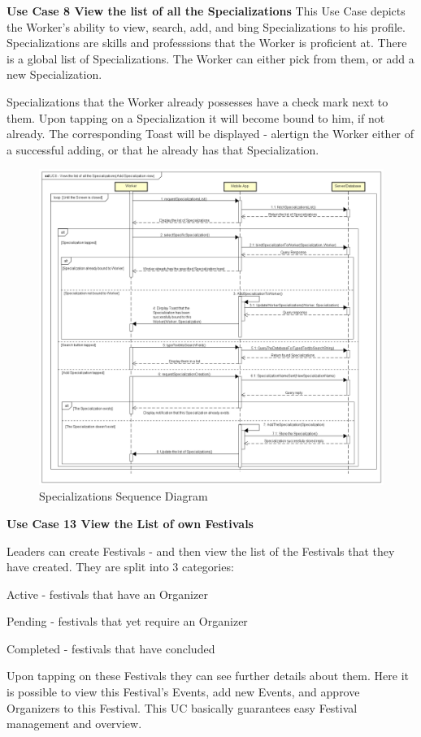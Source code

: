 				\textbf{Use Case 8 View the list of all the Specializations}
				This Use Case depicts the Worker's ability to view, search, add, and bing Specializations to his profile. Specializations are skills and professsions that the Worker is proficient at. There is a global list of Specializations. The Worker can either pick from them, or add a new Specialization.
				
				Specializations that the Worker already possesses have a check mark next to them. Upon tapping on a Specialization it will become bound to him, if not already. The corresponding Toast will be displayed - alertign the Worker either of a successful adding, or that he already has that Specialization. 
				\begin{figure}[H]
					\includegraphics[width=\linewidth]{diagrams/UC8 - View the list of all the Specializations.png}
					\caption{Specializations Sequence Diagram}
					\label{fig:sd_uc8_job_activities}
				\end{figure}
			
				
				\textbf{Use Case 13 View the List of own Festivals}
				
				Leaders can create Festivals - and then view the list of the Festivals that they have created. They are split into 3 categories:
				\begin{packed_enum}
					\item Active - festivals that have an Organizer
					\item Pending - festivals that yet require an Organizer
					\item Completed - festivals that have concluded
				\end{packed_enum}
				Upon tapping on these Festivals they can see further details about them. Here it is possible to view this Festival's Events, add new Events, and approve Organizers to this Festival. This UC basically guarantees easy Festival management and overview.

